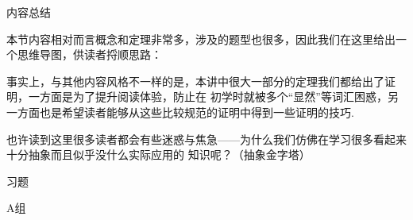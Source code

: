 \vspace{2ex}
\centerline{\heiti \Large 内容总结}
本节内容相对而言概念和定理非常多，涉及的题型也很多，因此我们在这里给出一个思维导图，供读者捋顺思路：

事实上，与其他内容风格不一样的是，本讲中很大一部分的定理我们都给出了证明，一方面是为了提升阅读体验，防止在
初学时就被多个``显然''等词汇困惑，另一方面也是希望读者能够从这些比较规范的证明中得到一些证明的技巧.

也许读到这里很多读者都会有些迷惑与焦急——为什么我们仿佛在学习很多看起来十分抽象而且似乎没什么实际应用的
知识呢？（抽象金字塔）
\vspace{2ex}

\centerline{\heiti \Large 习题}
\vspace{2ex}
{\kaishu }
\begin{flushright}
    \kaishu

\end{flushright}
\centerline{\heiti A组}
